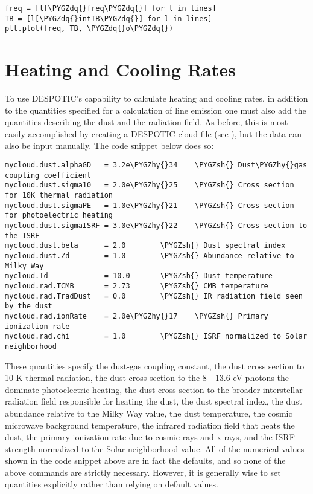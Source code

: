 \documentclass[letterpaper,10pt,english]{sphinxmanual}
\def\PYGZsh{\char`\#}
\def\PYGZhy{\char`\-}
\def\PYGZdq{\char`\"}
\begin{document}
\begin{Verbatim}[commandchars=\\\{\}]
freq = [l[\PYGZdq{}freq\PYGZdq{}] for l in lines]
TB = [l[\PYGZdq{}intTB\PYGZdq{}] for l in lines]
plt.plot(freq, TB, \PYGZdq{}o\PYGZdq{})
\end{Verbatim}


\section{Heating and Cooling Rates}
\label{functions:heating-and-cooling-rates}
To use DESPOTIC's capability to calculate heating and cooling rates,
in addition to the quantities specified for a calculation of line
emission one must also add the quantities describing the dust and the
radiation field. As before, this is most easily accomplished by
creating a DESPOTIC cloud file (see {\hyperref[cloudfiles:sec-cloudfiles]{\emph{}}}), but the
data can also be input manually. The code snippet below does so:

\begin{Verbatim}[commandchars=\\\{\}]
mycloud.dust.alphaGD   = 3.2e\PYGZhy{}34    \PYGZsh{} Dust\PYGZhy{}gas coupling coefficient
mycloud.dust.sigma10   = 2.0e\PYGZhy{}25    \PYGZsh{} Cross section for 10K thermal radiation
mycloud.dust.sigmaPE   = 1.0e\PYGZhy{}21    \PYGZsh{} Cross section for photoelectric heating
mycloud.dust.sigmaISRF = 3.0e\PYGZhy{}22    \PYGZsh{} Cross section to the ISRF
mycloud.dust.beta      = 2.0        \PYGZsh{} Dust spectral index
mycloud.dust.Zd        = 1.0        \PYGZsh{} Abundance relative to Milky Way
mycloud.Td             = 10.0       \PYGZsh{} Dust temperature
mycloud.rad.TCMB       = 2.73       \PYGZsh{} CMB temperature
mycloud.rad.TradDust   = 0.0        \PYGZsh{} IR radiation field seen by the dust
mycloud.rad.ionRate    = 2.0e\PYGZhy{}17    \PYGZsh{} Primary ionization rate
mycloud.rad.chi        = 1.0        \PYGZsh{} ISRF normalized to Solar neighborhood
\end{Verbatim}

These quantities specify the dust-gas coupling constant, the dust
cross section to 10 K thermal radiation, the dust cross section to the
8 - 13.6 eV photons the dominate photoelectric heating, the dust cross
section to the broader interstellar radiation field responsible for
heating the dust, the dust spectral index, the dust abundance relative
to the Milky Way value, the dust temperature, the cosmic microwave
background temperature, the infrared radiation field that heats the
dust, the primary ionization rate due to cosmic rays and x-rays, and
the ISRF strength normalized to the Solar neighborhood value. All of
the numerical values shown in the code snippet above are in fact the
defaults, and so none of the above commands are strictly
necessary. However, it is generally wise to set quantities explicitly
rather than relying on default values.
\end{document}
